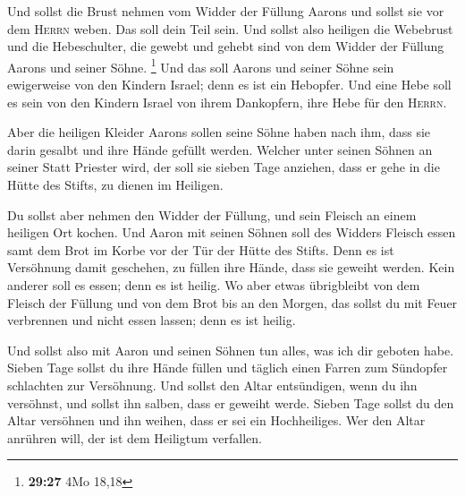  Und sollst die Brust nehmen vom Widder der Füllung
Aarons und sollst sie vor dem \textsc{Herrn} weben. Das soll dein Teil
sein.  Und sollst also heiligen die Webebrust und die
Hebeschulter, die gewebt und gehebt sind von dem Widder der Füllung
Aarons und seiner Söhne. \footnote{\textbf{29:27} 4Mo 18,18}
 Und das soll Aarons und seiner Söhne sein ewigerweise
von den Kindern Israel; denn es ist ein Hebopfer. Und eine Hebe soll es
sein von den Kindern Israel von ihrem Dankopfern, ihre Hebe für den
\textsc{Herrn}.

 Aber die heiligen Kleider Aarons sollen seine Söhne
haben nach ihm, dass sie darin gesalbt und ihre Hände gefüllt werden.
 Welcher unter seinen Söhnen an seiner Statt Priester
wird, der soll sie sieben Tage anziehen, dass er gehe in die Hütte des
Stifts, zu dienen im Heiligen.

 Du sollst aber nehmen den Widder der Füllung, und sein
Fleisch an einem heiligen Ort kochen.  Und Aaron mit
seinen Söhnen soll des Widders Fleisch essen samt dem Brot im Korbe vor
der Tür der Hütte des Stifts.  Denn es ist Versöhnung
damit geschehen, zu füllen ihre Hände, dass sie geweiht werden. Kein
anderer soll es essen; denn es ist heilig.  Wo aber etwas
übrigbleibt von dem Fleisch der Füllung und von dem Brot bis an den
Morgen, das sollst du mit Feuer verbrennen und nicht essen lassen; denn
es ist heilig.

 Und sollst also mit Aaron und seinen Söhnen tun alles,
was ich dir geboten habe. Sieben Tage sollst du ihre Hände füllen
 und täglich einen Farren zum Sündopfer schlachten zur
Versöhnung. Und sollst den Altar entsündigen, wenn du ihn versöhnst, und
sollst ihn salben, dass er geweiht werde.  Sieben Tage
sollst du den Altar versöhnen und ihn weihen, dass er sei ein
Hochheiliges. Wer den Altar anrühren will, der ist dem Heiligtum
verfallen.

